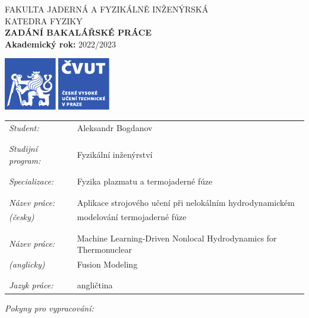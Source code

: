 \documentclass[11pt,a4paper]{article}
\begin{document}
\pagestyle{empty}

\parbox{0.60\textwidth}{%
{\footnotesize FAKULTA JADERNÁ A FYZIKÁLNĚ INŽENÝRSKÁ}\\[1mm]
{\footnotesize KATEDRA FYZIKY}\\[3mm]
{\bfseries\Large ZADÁNÍ BAKALÁŘSKÉ PRÁCE}\\[3mm]
{\bf Akademický rok:} 2022/2023
}
\qquad
\parbox{0.36\textwidth}{%
  \includegraphics[width=0.35\textwidth]{logo_CVUT_CZ_Pantone}
}

\vspace*{10ex}

\hspace{-1ex}\begin{tabular}{ll}
{\it Student:}          & Aleksandr Bogdanov\\\\\\
{\it Studijní program:} & Fyzikální inženýrství\\\\\\
{\it Specializace:}     & Fyzika plazmatu a termojaderné fúze\\\\\\
{\it Název práce:  }    & Aplikace strojového učení při nelokálním hydrodynamickém  \\ 
{\it (česky)       }    & modelování termojaderné fúze \\\\\\ 
{\it Název práce:  }    & Machine Learning-Driven Nonlocal Hydrodynamics
                          for Thermonuclear  \\
{\it (anglicky) }       & Fusion Modeling \\\\\\
{\it Jazyk práce:}      & angličtina
\end{tabular}

\vspace*{10ex}


{\it Pokyny pro vypracování:}

\vspace{3ex}
\end{document}
